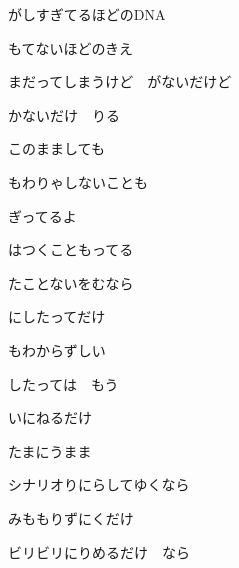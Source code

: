 \documentclass[a4paper,tate,twocolumn,12pt]{ltjtarticle}
\begin{document}
\begin{flushleft}
\begin{minipage}{\linewidth}
がしすぎてるほどのDNA

もてないほどのきえ
\end{minipage}

\vspace{2em}

\noindent\begin{minipage}{\linewidth}
まだってしまうけど　がないだけど

かないだけ　りる

このまましても

もわりゃしないことも

ぎってるよ
\end{minipage}

\vspace{1em}

\noindent\begin{minipage}{\linewidth}
はつくこともってる

たことないをむなら
\end{minipage}

\vspace{2em}

\noindent\begin{minipage}{\linewidth}
にしたってだけ

もわからずしい

したっては　もう

いにねるだけ

たまにうまま

シナリオりにらしてゆくなら

みももりずにくだけ

ビリビリにりめるだけ　なら
\end{minipage}

\vspace{1em}


\end{flushleft}
\end{document}
